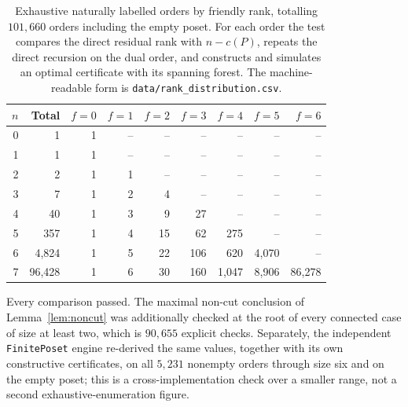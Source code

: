 \documentclass[11pt,letterpaper]{article}
\theoremstyle{definition}
\theoremstyle{remark}
\begin{document}
\begin{table}[ht]
\centering\small
\begin{tabular}{@{}rrrrrrrrr@{}}
\toprule
$n$ & Total & $f=0$ & $f=1$ & $f=2$ & $f=3$ & $f=4$ & $f=5$ & $f=6$\\
\midrule
0 & 1 & 1 & -- & -- & -- & -- & -- & --\\
1 & 1 & 1 & -- & -- & -- & -- & -- & --\\
2 & 2 & 1 & 1 & -- & -- & -- & -- & --\\
3 & 7 & 1 & 2 & 4 & -- & -- & -- & --\\
4 & 40 & 1 & 3 & 9 & 27 & -- & -- & --\\
5 & 357 & 1 & 4 & 15 & 62 & 275 & -- & --\\
6 & 4,824 & 1 & 5 & 22 & 106 & 620 & 4,070 & --\\
7 & 96,428 & 1 & 6 & 30 & 160 & 1,047 & 8,906 & 86,278\\
\bottomrule
\end{tabular}
\caption{Exhaustive naturally labelled orders by friendly rank, totalling
$101{,}660$ orders including the empty poset. For each order the test
compares the direct residual rank with $n-c(P)$, repeats the direct
recursion on the dual order, and constructs and simulates an optimal
certificate with its spanning forest. The machine-readable form is
\texttt{data/rank\_distribution.csv}.}
\label{tab:finite-tests}
\end{table}

Every comparison passed. The maximal non-cut conclusion of
Lemma~\ref{lem:noncut} was additionally checked at the root of every
connected case of size at least two, which is $90{,}655$ explicit checks.
Separately, the independent \texttt{FinitePoset} engine re-derived the same
values, together with its own constructive certificates, on all $5{,}231$
nonempty orders through size six and on the empty poset; this is a
cross-implementation check over a smaller range, not a second
exhaustive-enumeration figure.
\end{document}
